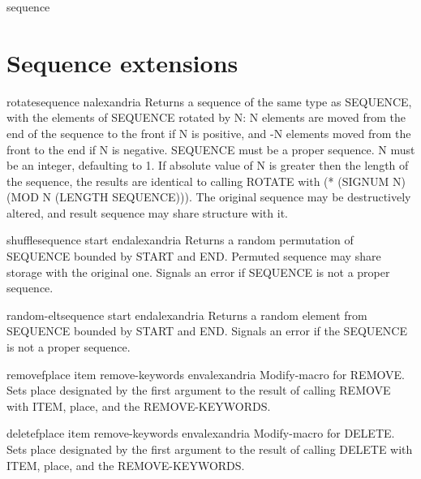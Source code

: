 \begin{class}{sequence}{}{}{}
  
\end{class}

\section{Sequence extensions}
\label{sec:sequence-extensions}

\begin{function}{rotate}{sequence \op n}{alexandria}{}
  Returns a sequence of the same type as SEQUENCE, with the elements of
SEQUENCE rotated by N: N elements are moved from the end of the sequence to
the front if N is positive, and -N elements moved from the front to the end if
N is negative. SEQUENCE must be a proper sequence. N must be an integer,
defaulting to 1. If absolute value of N is greater then the length of the
sequence, the results are identical to calling ROTATE with (* (SIGNUM N) (MOD
N (LENGTH SEQUENCE))). The original sequence may be destructively altered, and
result sequence may share structure with it.
\end{function}

\begin{function}{shuffle}{sequence \key start end}{alexandria}{}
  Returns a random permutation of SEQUENCE bounded by START and END.
Permuted sequence may share storage with the original one. Signals an
error if SEQUENCE is not a proper sequence.
\end{function}

\begin{function}{random-elt}{sequence \key start end}{alexandria}{}
  Returns a random element from SEQUENCE bounded by START and END. Signals an
error if the SEQUENCE is not a proper sequence.
\end{function}

\begin{macro}{removef}{place item \rest remove-keywords \env env}{alexandria}{}
  Modify-macro for REMOVE. Sets place designated by the first argument to
the result of calling REMOVE with ITEM, place, and the REMOVE-KEYWORDS.
\end{macro}

\begin{macro}{deletef}{place item \rest remove-keywords \env env}{alexandria}{}
  Modify-macro for DELETE. Sets place designated by the first argument to
the result of calling DELETE with ITEM, place, and the REMOVE-KEYWORDS.
\end{macro}

